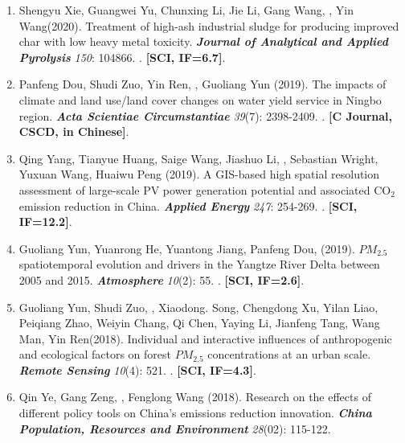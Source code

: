 \begin{enumerate}
    Response of syntrophic bacterial and methanogenic archaeal communities in paddy soil to soil type and phenological period of rice growth.
    \textbf{\textit{Journal of Cleaner Production}} \textit{278}: 123418.
    . \textbf{[SCI, IF=10.7]}.
\item
    Shengyu Xie, Guangwei Yu\CS, Chunxing Li, Jie Li, Gang Wang, \Shaoqing, Yin Wang\CS (2020).
    Treatment of high-ash industrial sludge for producing improved char with low heavy metal toxicity.
    \textbf{\textit{Journal of Analytical and Applied Pyrolysis}} \textit{150}: 104866.
    . \textbf{[SCI, IF=6.7]}.
\item
    Panfeng Dou, Shudi Zuo\CS, Yin Ren, \Shaoqing, Guoliang Yun (2019).
    The impacts of climate and land use/land cover changes on water yield service in Ningbo region.
    \textbf{\textit{Acta Scientiae Circumstantiae}} \textit{39}(7): 2398-2409.
    . \textbf{[C Journal, CSCD, in Chinese]}.
\item
    Qing Yang\CS, Tianyue Huang, Saige Wang\CS, Jiashuo Li\CS, \Shaoqing, Sebastian Wright, Yuxuan Wang, Huaiwu Peng (2019).
    A GIS-based high spatial resolution assessment of large-scale PV power generation potential and associated CO$_2$ emission reduction in China.
    \textbf{\textit{Applied Energy}} \textit{247}: 254-269.
    . \textbf{[SCI, IF=12.2]}.
\item
    Guoliang Yun, Yuanrong He\CS, Yuantong Jiang, Panfeng Dou, \Shaoqing \enspace (2019).
    $PM_{2.5}$ spatiotemporal evolution and drivers in the Yangtze River Delta between 2005 and 2015.
    \textbf{\textit{Atmosphere}} \textit{10}(2): 55.
    . \textbf{[SCI, IF=2.6]}.
\item
    Guoliang Yun, Shudi Zuo, \Shaoqing, Xiaodong. Song, Chengdong Xu, Yilan Liao, Peiqiang Zhao, Weiyin Chang, Qi Chen, Yaying Li, Jianfeng Tang, Wang Man, Yin Ren\CS (2018).
	Individual and interactive influences of anthropogenic and ecological factors on forest $PM_{2.5}$ concentrations at an urban scale.
    \textbf{\textit{Remote Sensing}} \textit{10}(4): 521.
    . \textbf{[SCI, IF=4.3]}.
\item
    Qin Ye, Gang Zeng\CS, \Shaoqing, Fenglong Wang (2018).
	Research on the effects of different policy tools on China’s emissions reduction innovation.
    \textbf{\textit{China Population, Resources and Environment}} \textit{28}(02): 115-122.

\end{enumerate}
